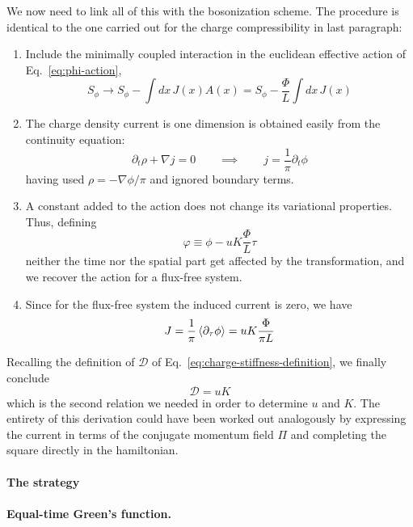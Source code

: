 We now need to link all of this with the bosonization scheme. The procedure is identical to the one carried out for the charge compressibility in last paragraph:
\begin{enumerate}
	\item Include the minimally coupled interaction in the euclidean effective action of Eq.~\eqref{eq:phi-action},
	\[
		S_\phi \to S_\phi - \int dx \, J(x) A(x) = S_\phi - \frac{\Phi}{L} \int dx \, J(x)
	\]
	\item The charge density current is one dimension is obtained easily from the continuity equation:
	\[
		\partial_t \rho + \nabla j = 0
		\qquad\implies\qquad
		j = \frac{1}{\pi} \partial_t \phi
	\]
	having used $\rho = - \nabla \phi/\pi$ and ignored boundary terms.
	\item A constant added to the action does not change its variational properties. Thus, defining
	\[
		\varphi \equiv \phi - uK \frac{\Phi}{L} \tau
	\]
	neither the time nor the spatial part get affected by the transformation, and we recover the action for a flux-free system.
	\item Since for the flux-free system the induced current is zero, we have
	\[
		J = \frac{1}{\pi} \ev{\partial_\tau \phi} = uK \frac{\Phi}{\pi L}
	\]
\end{enumerate}
Recalling the definition of $\mathcal{D}$ of Eq.~\eqref{eq:charge-stiffness-definition}, we finally conclude
\begin{equation}\label{eq:charge-stiffness}
	\mathcal{D} = uK
\end{equation}
which is the second relation we needed in order to determine $u$ and $K$. The entirety of this derivation could have been worked out analogously by expressing the current in terms of the conjugate momentum field $\Pi$ and completing the square directly in the hamiltonian.

\paragraph{The strategy}

\todo

\paragraph{Equal-time Green's function.}

